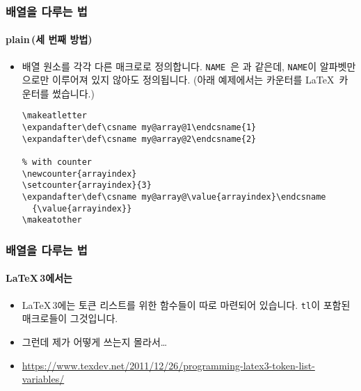\begin{frame}[fragile]
  \frametitle{배열을 다루는 법}
  \framesubtitle{plain\, (세 번째 방법)}
  \begin{itemize}
    \item 배열 원소를 각각 다른 매크로로 정의합니다. \texttt{\csname NAME \endcsname}은 \texttt{\NAME}과 같은데, \texttt{NAME}이 알파벳만으로만 이루어져 있지 않아도 정의됩니다. (아래 예제에서는 카운터를 \LaTeX\ 카운터를 썼습니다.)
    \begin{verbatim}
\makeatletter
\expandafter\def\csname my@array@1\endcsname{1}
\expandafter\def\csname my@array@2\endcsname{2}

% with counter
\newcounter{arrayindex}
\setcounter{arrayindex}{3}
\expandafter\def\csname my@array@\value{arrayindex}\endcsname
  {\value{arrayindex}}
\makeatother
    \end{verbatim}
  \end{itemize}
\end{frame}

\begin{frame}[fragile]
  \frametitle{배열을 다루는 법}
  \framesubtitle{\LaTeX\,3에서는}
  \begin{itemize}
    \item \LaTeX\,3에는 토큰 리스트를 위한 함수들이 따로 마련되어 있습니다. \texttt{tl}이 포함된 매크로들이 그것입니다.
    \item 그런데 제가 어떻게 쓰는지 몰라서\dots
    \item \url{https://www.texdev.net/2011/12/26/programming-latex3-token-list-variables/}
  \end{itemize}
\end{frame}